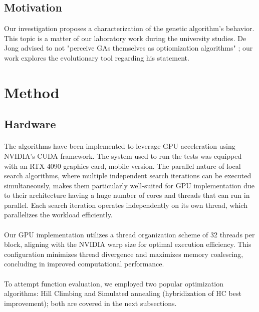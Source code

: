 \documentclass{article}
\begin{document}
\subsection{Motivation}

Our investigation proposes a characterization of the genetic algorithm's behavior. This topic is a matter of our laboratory work during the university studies. De Jong advised to not "perceive GAs themselves as optiomization algorithms" \cite{dejong}; our work explores the evolutionary tool regarding his statement.


\section{Method}

\subsection{Hardware}

\paragraph{}
The algorithms have been implemented to leverage GPU acceleration using NVIDIA's CUDA framework. The system used to run the tests was equipped with an RTX 4090 graphics card, mobile version. The parallel nature of local search algorithms, where multiple independent search iterations can be executed simultaneously, makes them particularly well-suited for GPU implementation due to their architecture having a huge number of cores and threads that can run in parallel. Each search iteration operates independently on its own thread, which parallelizes the workload efficiently.

\paragraph{}
Our GPU implementation utilizes a thread organization scheme of 32 threads per block, aligning with the NVIDIA warp size for optimal execution efficiency. This configuration minimizes thread divergence and maximizes memory coalescing, concluding in improved computational performance.

\paragraph{}
To attempt function evaluation, we employed two popular optimization algorithms: Hill Climbing and Simulated annealing (hybridization of HC best improvement); both are covered in the next subsections.
\end{document}
